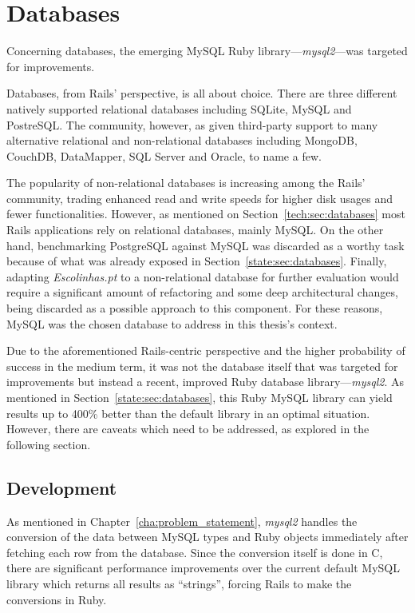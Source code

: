 \section{Databases} %
\label{solution:sec:databases}

Concerning databases, the emerging MySQL Ruby library---\textit{mysql2}---was targeted for improvements.

Databases, from Rails' perspective, is all about choice. There are three different natively supported relational databases including SQLite, MySQL and PostreSQL. The community, however, as given third-party support to many alternative relational and non-relational databases including MongoDB, CouchDB, DataMapper, SQL Server and Oracle, to name a few.

The popularity of non-relational databases is increasing among the Rails' community, trading enhanced read and write speeds for higher disk usages and fewer functionalities. However, as mentioned on Section~\ref{tech:sec:databases} most Rails applications rely on relational databases, mainly MySQL. On the other hand, benchmarking PostgreSQL against MySQL was discarded as a worthy task because of what was already exposed in Section~\ref{state:sec:databases}. Finally, adapting \textit{Escolinhas.pt} to a non-relational database for further evaluation would require a significant amount of refactoring and some deep architectural changes, being discarded as a possible approach to this component. For these reasons, MySQL was the chosen database to address in this thesis's context.

Due to the aforementioned Rails-centric perspective and the higher probability of success in the medium term, it was not the database itself that was targeted for improvements but instead a recent, improved Ruby database library---\textit{mysql2}. As mentioned in Section~\ref{state:sec:databases}, this Ruby MySQL library can yield results up to 400\% better than the default library in an optimal situation. However, there are caveats which need to be addressed, as explored in the following section.

\subsection{Development}
As mentioned in Chapter~\ref{cha:problem_statement}, \textit{mysql2} handles the conversion of the data between MySQL types and Ruby objects immediately after fetching each row from the database. Since the conversion itself is done in C, there are significant performance improvements over the current default MySQL library which returns all results as ``strings'', forcing Rails to make the conversions in Ruby. 

